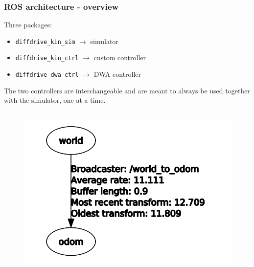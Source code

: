 \documentclass{beamer}
\begin{document}
\begin{frame}[allowframebreaks]
\frametitle{ROS architecture - overview}

Three packages:
\begin{itemize}
  \item \texttt{diffdrive\_kin\_sim} $\rightarrow$ simulator
  \item \texttt{diffdrive\_kin\_ctrl} $\rightarrow$ custom controller
  \item \texttt{diffdrive\_dwa\_ctrl} $\rightarrow$ DWA controller
\end{itemize}

\vspace{2em}

The two controllers are interchangeable and are meant to always be used together
with the simulator, one at a time.

\framebreak

\begin{columns}


\begin{figure}[H]
    \centering
    \includegraphics[scale=0.26]{img/ros_tools/rqttftree_custom.png}
\end{figure}



\end{columns}
\end{frame}
\end{document}
